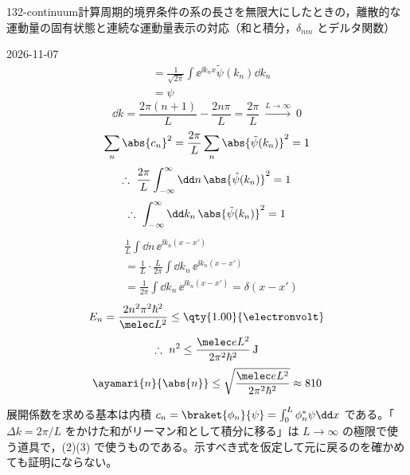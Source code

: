 \documentclass[uplatex,dvipdfmx,a4paper,11pt]{jsarticle}
\begin{document}
\begin{mondai}{132-continuum}{計算}{周期的境界条件の系の長さを無限大にしたときの，離散的な運動量の固有状態と連続な運動量表示の対応（和と積分，$\delta_{nm}$ とデルタ関数）}
\begin{kotaeutsushi}{2026-11-07}
\begin{align*}
&=\frac{1}{\sqrt{2\pi}}\int\ee^{\ii k_{n}x}\tilde{\psi}(k_{n})\dd k_{n}\\
&=\psi
\end{align*}
\[ \dd k=\frac{2\pi(n+1)}{L}-\frac{2n\pi}{L}=\frac{2\pi}{L}\ \xrightarrow{L\to\infty}\ 0 \]
\[ \sum_{n}\abs{c_{n}}^{2}=\frac{2\pi}{L}\sum_{n}\abs{\tilde{\psi}(k_{n})}^{2}=1 \]
\[ \therefore\ \frac{2\pi}{L}\int_{-\infty}^{\infty}\dd n\,\abs{\tilde{\psi}(k_{n})}^{2}=1 \]
\[ \therefore\ \int_{-\infty}^{\infty}\dd k_{n}\,\abs{\tilde{\psi}(k_{n})}^{2}=1 \]
\begin{align*}
&\frac{1}{L}\int\dd n\,\ee^{\ii k_{n}(x-x')}\\
&=\frac{1}{L}\cdot\frac{L}{2\pi}\int\dd k_{n}\,\ee^{\ii k_{n}(x-x')}\\
&=\frac{1}{2\pi}\int\dd k_{n}\,\ee^{\ii k_{n}(x-x')}=\delta(x-x')
\end{align*}
\[ E_{n}=\frac{2n^{2}\pi^{2}\hbar^{2}}{\melec L^{2}}\le\qty{1.00}{\electronvolt} \]
\[ \therefore\ n^{2}\le\frac{\melec eL^{2}}{2\pi^{2}\hbar^{2}}\,\mathrm{J} \]
\[ \ayamari{n}{\abs{n}}\le\sqrt{\frac{\melec eL^{2}}{2\pi^{2}\hbar^{2}}}\approx810 \]
\end{kotaeutsushi}
\begin{kizuki}
\item 展開係数を求める基本は内積 $c_{n}=\braket{\phi_{n}}{\psi}=\int_{0}^{L}\phi_{n}^{*}\psi\dd x$ である。「$\Delta k=2\pi/L$ をかけた和がリーマン和として積分に移る」は $L\to\infty$ の極限で使う道具で，(2)(3) で使うものである。示すべき式を仮定して元に戻るのを確かめても証明にならない。

\end{kizuki}
\end{mondai}
\end{document}
